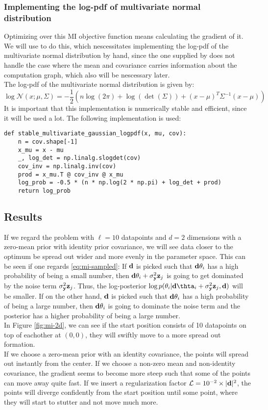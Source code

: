 \subsubsection{Implementing the log-pdf of multivariate normal distribution}
Optimizing over this MI objective function means calculating the gradient of it. 
We will use  to do this, which nescessitates implementing the log-pdf of the multivariate normal distribution by hand, 
since the one supplied by  does not handle the case where the mean and covariance carries information about the computation graph, which also will be nescessary later.\\
The log-pdf of the multivariate normal distribution is given by:
\begin{equation}
  \log \mathcal{N}(x; \mu, \Sigma) = -\frac{1}{2}(n\log(2\pi) + \log(\det(\Sigma)) + (x - \mu)^T\Sigma^{-1}(x - \mu))
\end{equation}
It is important that this implementation is numerically stable and efficient, since it will be used a lot.
The following implementation is used:
\begin{verbatim}
def stable_multivariate_gaussian_logpdf(x, mu, cov):
    n = cov.shape[-1]
    x_mu = x - mu
    _, log_det = np.linalg.slogdet(cov)
    cov_inv = np.linalg.inv(cov)
    prod = x_mu.T @ cov_inv @ x_mu
    log_prob = -0.5 * (n * np.log(2 * np.pi) + log_det + prod)
    return log_prob
\end{verbatim}
\subsection{Results}
If we regard the problem with $\ell = 10$ datapoints and $d=2$ dimensions with a zero-mean prior with identity prior covariance, 
we will see data closer to the optimum be spread out wider and more evenly in the parameter space.
This can be seen if one regards \eqref{eq:mi-sampled}:
If $\mathbf{d}$ is picked such that $\mathbf{d}\theta_i$ has a high probability of being a small number, then
$\mathbf{d}\theta_i + \sigma^2_{\mathbf{y}}\mathbf{z}_j$ is going to get dominated by the noise term $\sigma^2_{\mathbf{y}}\mathbf{z}_j$.
Thus, the log-posterior $\log p(\theta_i | \B{d}\thta_i + \sigma^2_\B{y}\B{z}_j, \B{d})$ will be smaller.
If on the other hand, $\mathbf{d}$ is picked such that $\mathbf{d}\theta_i$ has a high probability of being a large number, then $\mathbf{d}\theta_i$ is going to dominate the noise term
and the posterior has a higher probability of being a large number.\\
In Figure \ref{fig:mi-2d}, we can see if the start position consists of 10 datapoints on top of eachother at $(0,0)$, they will swiftly move to a more spread out formation.\\
If we choose a zero-mean prior with an identity covariance, the points will spread out instantly from the center. If we choose a non-zero mean and non-identity covariance, 
the gradient seems to become more steep such that some of the points can move away quite fast.
If we insert a regularization factor $\mathcal{L} = 10^{-2}\times |\mathbf{d}|^2$, the points will diverge confidently from the start position until some point, where they will start to stutter and not move much more.


